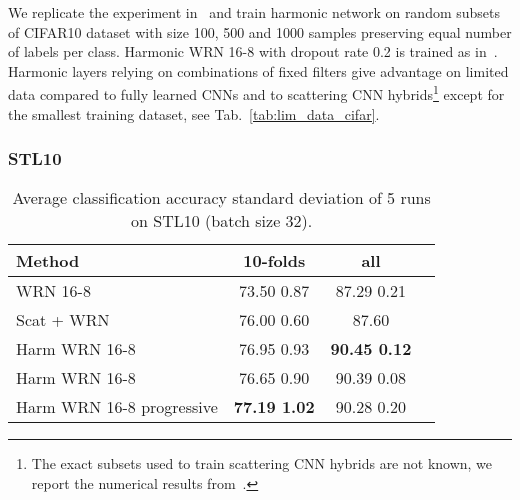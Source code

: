 \documentclass[conference]{IEEEtran}
\begin{document}
We replicate the experiment in~\cite{Oyallon18} and train harmonic network on random subsets of CIFAR10 dataset with size 100, 500 and 1000 samples preserving equal number of labels per class. Harmonic WRN 16-8 with dropout rate 0.2 is trained as in~\cite{Oyallon18}. Harmonic layers relying on combinations of fixed filters give advantage on limited data compared to fully learned CNNs and to scattering CNN hybrids\footnote{The exact subsets used to train scattering CNN hybrids are not known, we report the numerical results from~\cite{Oyallon18}.} except for the smallest training dataset, see Tab.~\ref{tab:lim_data_cifar}. 

\subsubsection{STL10}

\begin{table}
\centering
\caption{Average classification accuracy  standard deviation of 5 runs on STL10 (batch size 32).} \label{tab:stl}
\begin{tabular}{|l|c|c|c|}
 \hline
 \textbf{Method} & \textbf{10-folds} & \textbf{all} \\
 \hline
 WRN 16-8 & 73.50  0.87 & 87.29  0.21 \\
 Scat + WRN~\cite{Oyallon18} & 76.00  0.60 & \hspace{-1.04cm} 87.60  \\
 Harm WRN 16-8 & 76.95  0.93 & \textbf{90.45  0.12} \\
 Harm WRN 16-8  & 76.65  0.90 & 90.39  0.08 \\
 Harm WRN 16-8 progressive  & \textbf{77.19  1.02} & 90.28  0.20 \\
 \hline
\end{tabular}
\end{table}
\end{document}
